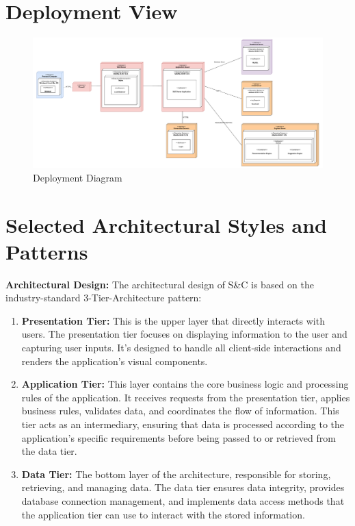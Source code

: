 \section{Deployment View}

\begin{figure}[H]
    \centering
    \includegraphics[width=1.0\textwidth]{Images/Deployment_Diagram.pdf}
    \caption{Deployment Diagram}
    \label{fig:deployment-diagram}
\end{figure}


\section{Selected Architectural Styles and Patterns}
\label{sec:selected-architectural-styles-patterns}%

\par{\textbf{Architectural Design:}} The architectural design of S\&C is based on the industry-standard 3-Tier-Architecture pattern:

\begin{enumerate}
      \item \textbf{Presentation Tier:} This is the upper layer that directly interacts with users. The presentation tier
            focuses on displaying information to the user and capturing user inputs. It's designed to handle all client-side
            interactions and renders the application's visual components.
      \item \textbf{Application Tier:} This layer contains the core business logic and processing rules of the
            application. It receives requests from the presentation tier, applies business rules, validates data, and
            coordinates the flow of information. This tier acts as an intermediary, ensuring that data is processed
            according to the application's specific requirements before being passed to or retrieved from the data tier.
      \item \textbf{Data Tier:} The bottom layer of the architecture, responsible for storing, retrieving, and managing
            data. The data tier ensures data integrity, provides database connection management, and implements data
            access methods that the application tier can use to interact with the stored information.
\end{enumerate}

